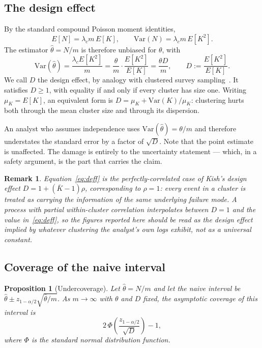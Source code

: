 \documentclass[11pt]{article}
\newtheorem{proposition}{Proposition}
\newtheorem{remark}{Remark}
\begin{document}
\subsection{The design effect}

By the standard compound Poisson moment identities,
\begin{equation}
E[N] = \lambda_c m \, E[K],
\qquad
\mathrm{Var}(N) = \lambda_c m \, E[K^2].
\end{equation}
The estimator $\hat{\theta} = N/m$ is therefore unbiased for $\theta$, with
\begin{equation}
\mathrm{Var}(\hat{\theta})
= \frac{\lambda_c E[K^2]}{m}
= \frac{\theta}{m} \cdot \frac{E[K^2]}{E[K]}
= \frac{\theta D}{m},
\qquad
D := \frac{E[K^2]}{E[K]} .
\label{eq:deff}
\end{equation}
We call $D$ the design effect, by analogy with clustered survey
sampling~\cite{kish1965survey}. It satisfies $D \geq 1$, with equality if and only
if every cluster has size one. Writing $\mu_K = E[K]$, an equivalent form is
$D = \mu_K + \mathrm{Var}(K)/\mu_K$: clustering hurts both through the mean cluster
size and through its dispersion.

An analyst who assumes independence uses $\mathrm{Var}(\hat\theta) = \theta/m$ and
therefore understates the standard error by a factor of $\sqrt{D}$. Note that the
point estimate is unaffected. The damage is entirely to the uncertainty
statement --- which, in a safety argument, is the part that carries the claim.

\begin{remark}
Equation~\eqref{eq:deff} is the perfectly-correlated case of Kish's design
effect $D = 1 + (\bar{K} - 1)\rho$, corresponding to $\rho = 1$: every event in a
cluster is treated as carrying the information of the same underlying failure
mode. A process with partial within-cluster correlation interpolates between
$D = 1$ and the value in~\eqref{eq:deff}, so the figures reported here should be
read as the design effect implied by whatever clustering the analyst's own logs
exhibit, not as a universal constant.
\end{remark}

\subsection{Coverage of the naive interval}

\begin{proposition}[Undercoverage]
\label{prop:coverage}
Let $\hat{\theta} = N/m$ and let the naive interval be
$\hat{\theta} \pm z_{1-\alpha/2}\sqrt{\hat{\theta}/m}$. As $m \to \infty$ with
$\theta$ and $D$ fixed, the asymptotic coverage of this interval is
\begin{equation}
2\,\Phi\!\left(\frac{z_{1-\alpha/2}}{\sqrt{D}}\right) - 1 ,
\end{equation}
where $\Phi$ is the standard normal distribution function.
\end{proposition}
\end{document}
